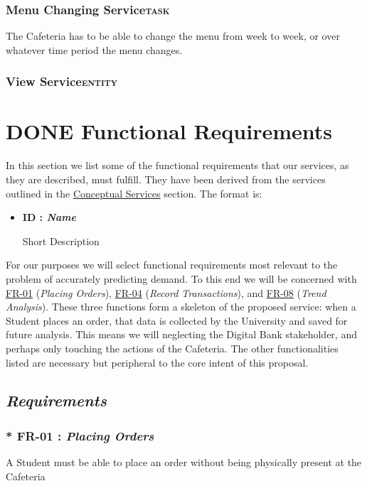 \documentclass[11pt]{article}
\begin{document}
\subsubsection*{Menu Changing Service\hfill{}\textsc{task}}
\label{sec:org002019e}
The Cafeteria has to be able to change the menu from week to week,
or over whatever time period the menu changes.

\subsubsection{View Service\hfill{}\textsc{entity}}
\label{sec:org5183405}
\section{{\bfseries\sffamily DONE} Functional Requirements}
\label{sec:orgc263671}

In this section we list some of the functional requirements that our
services, as they are described, must fulfill. They have been
derived from the services outlined in the \hyperref[sec:org85e4dc4]{Conceptual Services}
section. The format is:

\begin{itemize}
\item \textbf{ID : \emph{Name}}

Short Description
\end{itemize}

For our purposes we will select functional requirements most
relevant to the problem of accurately predicting demand. To this end
we will be concerned with \hyperref[org61a3033]{FR-01} (\emph{Placing Orders}), \hyperref[orgf763ee3]{FR-04} (\emph{Record
Transactions}), and \hyperref[org9a5b87c]{FR-08} (\emph{Trend Analysis}). These three functions
form a skeleton of the proposed service: when a Student places an
order, that data is collected by the University and saved for future
analysis. This means we will neglecting the Digital Bank
stakeholder, and perhaps only touching the actions of the
Cafeteria. The other functionalities listed are necessary but
peripheral to the core intent of this proposal.

\newpage
\subsection*{\emph{Requirements}}
\label{sec:orga6ac3e1}
\subsubsection*{* \label{org61a3033}FR-01 : \emph{Placing Orders}}
\label{sec:orga2b7abe}
A Student must be able to place an order without being physically
present at the Cafeteria
\end{document}
